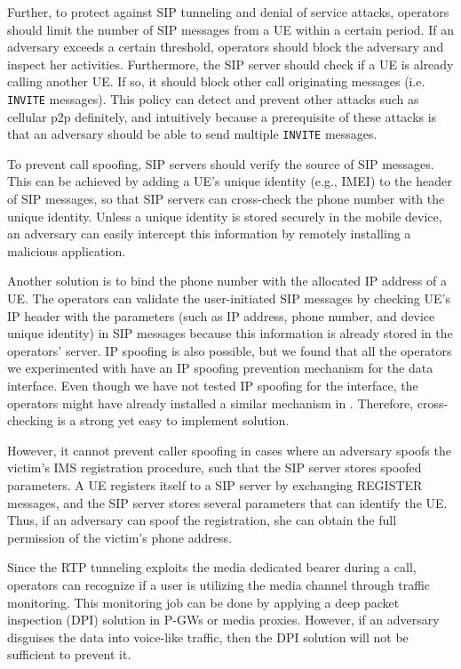 Further, to protect against SIP tunneling and denial of service attacks,
operators should limit the number of SIP messages from a UE within a certain
period. If an adversary exceeds a certain threshold, operators should block the
adversary and inspect her activities.  Furthermore, the SIP server should check
if a UE is already calling another UE. If so, it should block other call
originating messages (i.e. {\tt INVITE} messages). This policy can detect and
prevent other attacks such as cellular p2p definitely, and intuitively because a
prerequisite of these attacks is that an adversary should be able to send
multiple {\tt INVITE} messages.

To prevent call spoofing, SIP servers should verify the source of SIP messages.
This can be achieved by adding a UE's unique identity (e.g., IMEI) to the header
of SIP messages, so that SIP servers can cross-check the phone number with the
unique identity.
Unless a unique identity is stored securely in the mobile device, an adversary can
easily intercept this information by remotely installing a malicious
application.

Another solution is to bind the phone number with the allocated IP address of a UE. The
operators can validate the user-initiated SIP messages by checking UE's IP
header with the parameters (such as IP address, phone number, and device unique
identity) in SIP messages because this information is already stored in the
operators\rq{} server.  IP spoofing is also possible, but we found that all the
operators we experimented with have an IP spoofing prevention mechanism for the
data interface. Even though we have not tested IP spoofing for the \vt
interface, the operators might have already installed a similar mechanism in
\vt. Therefore, cross-checking is a strong yet easy to implement solution.

However, it cannot prevent caller spoofing in cases where an adversary spoofs 
the victim's IMS registration procedure, such that the SIP server stores spoofed
parameters. A UE registers itself to a SIP server by exchanging REGISTER messages,
and the SIP server stores several parameters that can identify the UE. Thus, if
an adversary can spoof the registration, she can obtain the full
permission of the victim's phone address.  

Since the RTP tunneling exploits the media dedicated bearer during a \vt call,
operators can recognize if a user is utilizing the media channel through traffic
monitoring. This monitoring job can be done by applying a deep packet inspection
(DPI) solution in P-GWs or media proxies. However, if an adversary disguises
the data into voice-like traffic, then the DPI solution will not be sufficient to prevent it.

